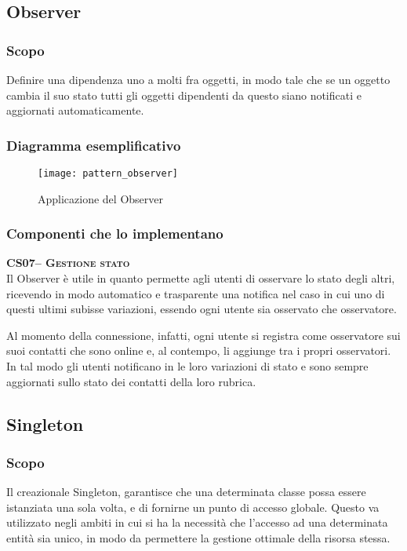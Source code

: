 \subsection{Observer}

\subsubsection{Scopo}
Definire una dipendenza uno a molti fra oggetti, in modo tale che se un oggetto cambia il suo stato tutti gli oggetti dipendenti da questo siano notificati e aggiornati automaticamente.

\subsubsection{Diagramma esemplificativo}
\begin{figure}[H]
  \centering
  \texttt{[image: pattern\_observer]}
  \caption{Applicazione del  Observer}\label{fig:observer}
\end{figure}

\subsubsection{Componenti che lo implementano}
\begin{description}
  \item{\scshape\bfseries CS07-- Gestione stato}\\
Il  Observer è utile in quanto permette agli utenti di osservare lo stato degli altri, ricevendo in modo automatico e trasparente una notifica nel caso in cui uno di questi ultimi subisse variazioni, essendo ogni utente sia osservato che osservatore.

Al momento della connessione, infatti, ogni utente si registra come osservatore sui suoi contatti che sono online e, al contempo, li aggiunge tra i propri osservatori. In tal modo gli utenti notificano in  le loro variazioni di stato e sono sempre aggiornati sullo stato dei contatti della loro rubrica.
\end{description}

\subsection{Singleton}

\subsubsection{Scopo}
Il  creazionale Singleton, garantisce che una determinata classe possa essere istanziata una sola volta, e di fornirne un punto di accesso globale. Questo  va utilizzato negli ambiti in cui si ha la necessità che l'accesso ad una determinata entità sia unico, in modo da permettere la gestione ottimale della risorsa stessa.

